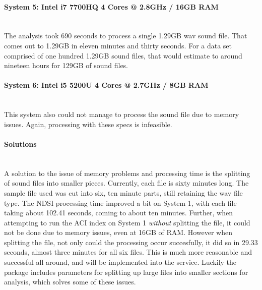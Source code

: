 \paragraph{System 5: Intel i7 7700HQ 4 Cores @ 2.8GHz / 16GB RAM} \mbox{}\\[\paragraphheaderspace]
The analysis took 690 seconds to process a single 1.29GB wav sound file. That comes out to 1.29GB in eleven minutes and thirty seconds. For a data set comprised of one hundred 1.29GB sound files, that would estimate to around nineteen hours for 129GB of sound files.

\paragraph{System 6: Intel i5 5200U 4 Cores @ 2.7GHz / 8GB RAM} \mbox{}\\[\paragraphheaderspace]
This system also could not manage to process the sound file due to memory issues. Again, processing with these specs is infeasible.

\paragraph{Solutions} \mbox{}\\[\paragraphheaderspace]
A solution to the issue of memory problems and processing time is the splitting of sound files into smaller pieces. Currently, each file is sixty minutes long. The sample file used was cut into six, ten minute parts, still retaining the wav file type. The NDSI processing time improved a bit on System 1, with each file taking  about 102.41 seconds, coming to about ten minutes. Further, when attempting to run the ACI index on System 1 \textit{without} splitting the file, it could not be done due to memory issues, even at 16GB of RAM. However when splitting the file, not only could the processing occur succesfully, it did so in 29.33 seconds, almost three minutes for all six files. This is much more reasonable and successful all around, and will be implemented into the service. Luckily the  package includes parameters for splitting up large files into smaller sections for analysis, which solves some of these issues.

